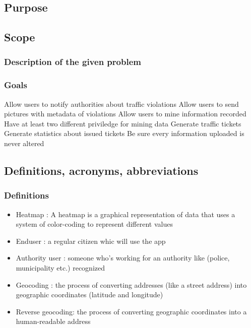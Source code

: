 \subsection{Purpose}

\subsection{Scope}

\subsubsection{Description of the given problem}


\subsubsection{Goals}
\begin{enumerate}
   Allow users to notify authorities about traffic violations
   Allow users to send pictures with metadata of violations
   Allow users to mine information recorded
   Have at least two different  priviledge for mining data
   Generate traffic tickets
   Generate statistics about issued tickets
   Be sure every information uploaded is never altered
\end{enumerate}



\subsection{Definitions,  acronyms,  abbreviations}

\subsubsection{Definitions}
\begin{itemize}
  \item Heatmap : A heatmap is a graphical representation of data that uses a system of color-coding to represent different values
  \item Enduser : a regular citizen whic will use the app
  \item Authority user : someone who's working for an authority like (police, municipality etc.) recognized
  \item Geocoding : the process of converting addresses (like a street address) into geographic coordinates (latitude and longitude)
  \item Reverse geocoding:  the process of converting geographic coordinates into a human-readable address

\end{itemize}



